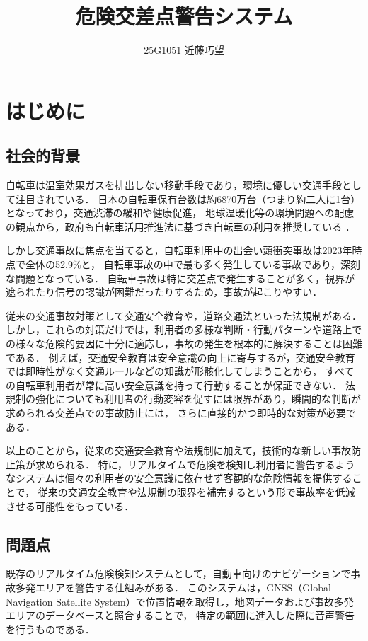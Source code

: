 \documentclass[uplatex,dvipdfmx]{jsarticle}
\begin{document}
\title{危険交差点警告システム}
\author{25G1051 近藤巧望}
\maketitle

\section{はじめに}

\subsection{社会的背景}
自転車は温室効果ガスを排出しない移動手段であり，環境に優しい交通手段として注目されている．
日本の自転車保有台数は約6870万台（つまり約二人に1台）となっており，交通渋滞の緩和や健康促進，
地球温暖化等の環境問題への配慮の観点から，政府も自転車活用推進法に基づき自転車の利用を推奨している
\cite{ref:koutuusyou_1,ref:koutuusyou_2}．

しかし交通事故に焦点を当てると，自転車利用中の出会い頭衝突事故は2023年時点で全体の52.9\%と，
自転車事故の中で最も多く発生している事故であり，深刻な問題となっている\cite{ref:sonpo_1}．
自転車事故は特に交差点で発生することが多く，視界が遮られたり信号の認識が困難だったりするため，事故が起こりやすい．

従来の交通事故対策として交通安全教育や，道路交通法といった法規制がある．
しかし，これらの対策だけでは，利用者の多様な判断・行動パターンや道路上での様々な危険的要因に十分に適応し，事故の発生を根本的に解決することは困難である．
例えば，交通安全教育は安全意識の向上に寄与するが，交通安全教育では即時性がなく交通ルールなどの知識が形骸化してしまうことから，
すべての自転車利用者が常に高い安全意識を持って行動することが保証できない．
法規制の強化についても利用者の行動変容を促すには限界があり，瞬間的な判断が求められる交差点での事故防止には，
さらに直接的かつ即時的な対策が必要である．

以上のことから，従来の交通安全教育や法規制に加えて，技術的な新しい事故防止策が求められる．
特に，リアルタイムで危険を検知し利用者に警告するようなシステムは個々の利用者の安全意識に依存せず客観的な危険情報を提供することで，
従来の交通安全教育や法規制の限界を補完するという形で事故率を低減させる可能性をもっている．

\subsection{問題点}
既存のリアルタイム危険検知システムとして，自動車向けのナビゲーションで事故多発エリアを警告する仕組みがある．
このシステムは，GNSS（Global Navigation Satellite System）で位置情報を取得し，地図データおよび事故多発エリアのデータベースと照合することで，
特定の範囲に進入した際に音声警告を行うものである．
\end{document}
